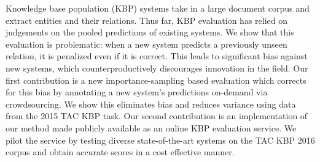 Knowledge base population (KBP) systems take in a large document corpus and extract entities and their relations. Thus far, KBP evaluation has relied on judgements on the pooled predictions of existing systems. We show that this evaluation is problematic: when a new system predicts a previously unseen relation, it is penalized even if it is correct. This leads to significant bias against new systems, which counterproductively discourages innovation in the field. Our first contribution is a new importance-sampling based evaluation which corrects for this bias by annotating a new system's predictions on-demand via crowdsourcing. We show this eliminates bias and reduces variance using data from the 2015 TAC KBP task. Our second contribution is an implementation of our method made publicly available as an online KBP evaluation service. We pilot the service by testing diverse state-of-the-art systems on the TAC KBP 2016 corpus and obtain accurate scores in a cost effective manner.
